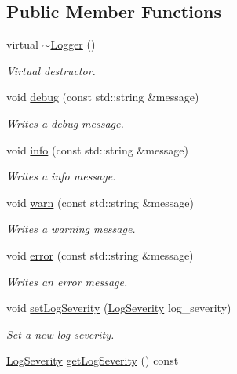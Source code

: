 \subsection*{Public Member Functions}
\begin{DoxyCompactItemize}
\item 
\hypertarget{class_assimp_1_1_logger_a27dd2bd4fd3b9cde0635ed22aad687c3}{virtual \hyperlink{class_assimp_1_1_logger_a27dd2bd4fd3b9cde0635ed22aad687c3}{$\sim$\-Logger} ()}\label{class_assimp_1_1_logger_a27dd2bd4fd3b9cde0635ed22aad687c3}

\begin{DoxyCompactList}\small\item\em Virtual destructor. \end{DoxyCompactList}\item 
void \hyperlink{class_assimp_1_1_logger_af978b5a592fef74ec3b5634ebdf22a3b}{debug} (const std\-::string \&message)
\begin{DoxyCompactList}\small\item\em Writes a debug message. \end{DoxyCompactList}\item 
void \hyperlink{class_assimp_1_1_logger_a6774f0cc4373195ef899799a40ad9879}{info} (const std\-::string \&message)
\begin{DoxyCompactList}\small\item\em Writes a info message. \end{DoxyCompactList}\item 
void \hyperlink{class_assimp_1_1_logger_afe0f9914014c7a62780a67557b9fc0d3}{warn} (const std\-::string \&message)
\begin{DoxyCompactList}\small\item\em Writes a warning message. \end{DoxyCompactList}\item 
void \hyperlink{class_assimp_1_1_logger_a42b564d43664bb9fdc72613aa3e54770}{error} (const std\-::string \&message)
\begin{DoxyCompactList}\small\item\em Writes an error message. \end{DoxyCompactList}\item 
void \hyperlink{class_assimp_1_1_logger_a8fb4fa4c2c329a36ac39bc9c743925f1}{set\-Log\-Severity} (\hyperlink{class_assimp_1_1_logger_a8b6248a0fd062431e8572556350d29e6}{Log\-Severity} log\-\_\-severity)
\begin{DoxyCompactList}\small\item\em Set a new log severity. \end{DoxyCompactList}\item 
\hypertarget{class_assimp_1_1_logger_a2b4cee0d7f1f8948308ab6a8ee1a3dc7}{\hyperlink{class_assimp_1_1_logger_a8b6248a0fd062431e8572556350d29e6}{Log\-Severity} \hyperlink{class_assimp_1_1_logger_a2b4cee0d7f1f8948308ab6a8ee1a3dc7}{get\-Log\-Severity} () const }\label{class_assimp_1_1_logger_a2b4cee0d7f1f8948308ab6a8ee1a3dc7}


\end{DoxyCompactItemize}
